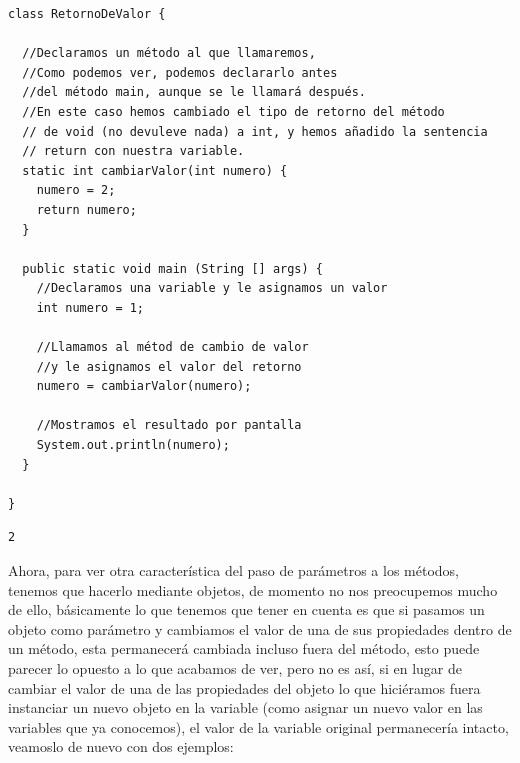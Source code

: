 \documentclass[11pt]{article}
\begin{document}
\begin{verbatim}
class RetornoDeValor {

  //Declaramos un método al que llamaremos,
  //Como podemos ver, podemos declararlo antes
  //del método main, aunque se le llamará después.
  //En este caso hemos cambiado el tipo de retorno del método
  // de void (no devuleve nada) a int, y hemos añadido la sentencia
  // return con nuestra variable.
  static int cambiarValor(int numero) {
    numero = 2;
    return numero;
  }

  public static void main (String [] args) {
    //Declaramos una variable y le asignamos un valor
    int numero = 1;

    //Llamamos al métod de cambio de valor
    //y le asignamos el valor del retorno
    numero = cambiarValor(numero);

    //Mostramos el resultado por pantalla
    System.out.println(numero);
  }

}
\end{verbatim}

\begin{verbatim}
2
\end{verbatim}

Ahora, para ver otra característica del paso de parámetros a los métodos, tenemos que hacerlo mediante objetos, de momento no nos preocupemos mucho de ello, básicamente lo que tenemos que tener en cuenta es que si pasamos un objeto como parámetro y cambiamos el valor de una de sus propiedades dentro de un método, esta permanecerá cambiada incluso fuera del método, esto puede parecer lo opuesto a lo que acabamos de ver, pero no es así, si en lugar de cambiar el valor de una de las propiedades del objeto lo que hiciéramos fuera instanciar un nuevo objeto en la variable (como asignar un nuevo valor en las variables que ya conocemos), el valor de la variable original permanecería intacto, veamoslo de nuevo con dos ejemplos:
\end{document}
